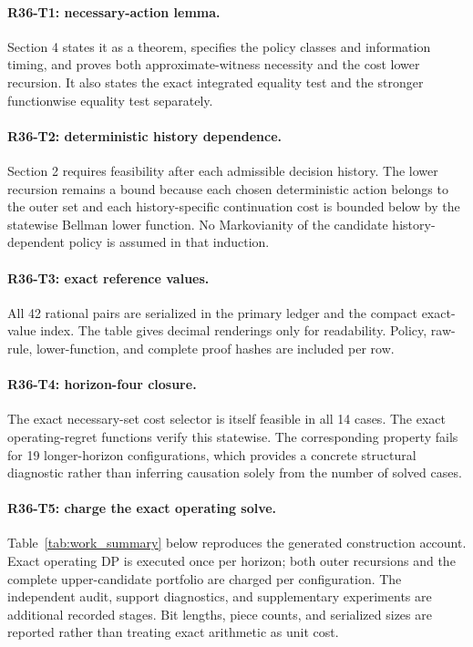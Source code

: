 \paragraph{R36-T1: necessary-action lemma.} Section 4 states it as a theorem, specifies the policy classes and information timing, and proves both approximate-witness necessity and the cost lower recursion. It also states the exact integrated equality test and the stronger functionwise equality test separately.

\paragraph{R36-T2: deterministic history dependence.} Section 2 requires feasibility after each admissible decision history. The lower recursion remains a bound because each chosen deterministic action belongs to the outer set and each history-specific continuation cost is bounded below by the statewise Bellman lower function. No Markovianity of the candidate history-dependent policy is assumed in that induction.

\paragraph{R36-T3: exact reference values.} All 42 rational pairs are serialized in the primary ledger and the compact exact-value index. The table gives decimal renderings only for readability. Policy, raw-rule, lower-function, and complete proof hashes are included per row.

\paragraph{R36-T4: horizon-four closure.} The exact necessary-set cost selector is itself feasible in all 14 cases. The exact operating-regret functions verify this statewise. The corresponding property fails for 19 longer-horizon configurations, which provides a concrete structural diagnostic rather than inferring causation solely from the number of solved cases.

\paragraph{R36-T5: charge the exact operating solve.} Table~\ref{tab:work_summary} below reproduces the generated construction account. Exact operating DP is executed once per horizon; both outer recursions and the complete upper-candidate portfolio are charged per configuration. The independent audit, support diagnostics, and supplementary experiments are additional recorded stages. Bit lengths, piece counts, and serialized sizes are reported rather than treating exact arithmetic as unit cost.


